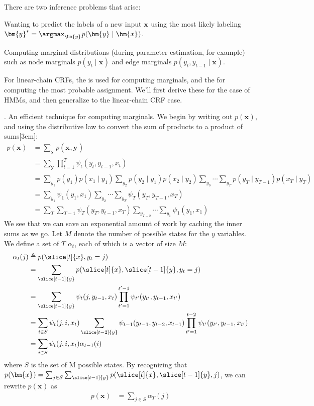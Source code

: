 \documentclass[11pt]{article}
\renewcommand\vec[2][]{\bm{#2}_{#1}}
\newcommand\myspace[1][]{\vspace{#1\bigskipamount}}
\newcommand\p{\Needspace{10\baselineskip} \noindent}
\begin{document}
\p There are two inference problems that arise:
\begin{compactenum}
	\item Wanting to predict the labels of a new input $\vec{x}$ using the most likely labeling $\vec{y}^* = \argmax_{\vec y} p(\vec{y} \mid \vec{x})$. 
	
	\item Computing marginal distributions (during parameter estimation, for example) such as node marginals $p(y_t \mid \vec x)$ and edge marginals $p(y_t, y_{t -1} \mid \vec x)$. 
\end{compactenum}
For linear-chain CRFs, the  is used for computing marginals, and the  for computing the most probable assignment. We'll first derive these for the case of HMMs, and then generalize to the linear-chain CRF case. 

\myspace
\p {}. An efficient technique for computing marginals. We begin by writing out $p(\vec x)$, and using the distributive law to convert the sum of products to a product of sums[3em]:
\begin{align}
	p(\vec x) &= \sum_{\vec y} p(\vec x, \vec y) \\
	&= \sum_{\vec y} \prod_{t = 1}^{T} \psi_t(y_t, y_{t - 1}, x_t) \\
	&= \sum_{y_1} p(y_1)p(x_1 \mid y_1) \sum_{y_2} p(y_2 \mid y_1) p(x_2 \mid y_2) \sum_{y_3} \cdots \sum_{y_T} p(y_T \mid y_{T-1}) p(x_T \mid y_{T}) \\
	&= \sum_{y_1} \psi_1(y_1, x_1) \sum_{y_2} \cdots \sum_{y_T} \psi_T(y_T, y_{T - 1}, x_T) \\
	&= \sum_T \sum_{T - 1} \psi_T(y_T, y_{t - 1}, x_T) \sum_{y_{T - 2}} \cdots \sum_{y_1} \psi_1(y_1, x_1) \label{crf-4-3}
\end{align}
We see that we can save an exponential amount of work by caching the inner sums as we go. Let $M$ denote the number of possible states for the $y$ variables. We define a set of $T$  $\alpha_t$, each of which is a vector of size $M$:
\begin{align}
	\alpha_t(j) &\triangleq p(\slice[t]{x}, y_t = j) \label{alpha-1} \\
	&= \sum_{\slice[t-1]{y}} p(\slice[t]{x}, \slice[t-1]{y}, y_t = j) \label{alpha-2} \\
	&= \sum_{\slice[t-1]{y}} \psi_t(j, y_{t - 1}, x_t) \prod_{t' = 1}^{t' - 1} \psi_{t'}(y_{t'}, y_{t - 1}, x_{t'}) \\
	&= \sum_{i \in S} \psi_t(j, i, x_t) \sum_{\slice[t-2]{y}} \psi_{t-1}(y_{t -1}, y_{t -2}, x_{t -1}) \prod_{t' = 1}^{t - 2} \psi_{t'}(y_{t'}, y_{t - 1}, x_{t'}) \\
	&= \sum_{i \in S} \psi_t(j, i, x_t) \alpha_{t - 1}(i)
\end{align}
where $S$ is the set of M possible states. By recognizing that $p(\vec x) = \sum_{j \in S}\sum_{\slice[t-1]{y}} p(\slice[t]{x}, \slice[t-1]{y}, j)$, we can rewrite $p(\vec x)$ as
\begin{align}
	p(\vec x) &= \sum_{j \in S} \alpha_T(j) \label{alpha-3}
\end{align}
\end{document}
